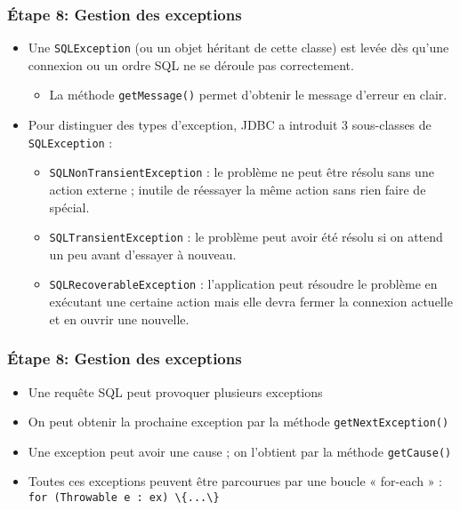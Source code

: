 \documentclass[xcolor=pdftex,x11names,table]{beamer}
\begin{document}
    \begin{frame}
    \frametitle{Étape 8: Gestion des exceptions}
    	\begin{itemize}
    		\item Une \lstinline$SQLException$ (ou un objet héritant de cette classe) est levée dès qu’une connexion 
    		ou un ordre SQL ne se déroule pas correctement.
    		  \begin{itemize}
    				\item La méthode \lstinline$getMessage()$ permet d'obtenir le message d'erreur en clair.
					\end{itemize}
				\item Pour distinguer des types d’exception, JDBC a introduit 3 sous-classes de \lstinline$SQLException$ :
				  \begin{itemize}
    				\item \lstinline$SQLNonTransientException$ : le problème ne peut être résolu sans une action externe ; 
    				inutile de réessayer la même action sans rien faire de spécial.
    				\item \lstinline$SQLTransientException$ : le problème peut avoir été résolu si on attend un peu avant 
    				d’essayer à nouveau.
    				\item \lstinline$SQLRecoverableException$ : l’application peut résoudre le problème en exécutant une 
    				certaine action mais elle devra fermer la connexion actuelle et en ouvrir une nouvelle.
					\end{itemize}
			\end{itemize}
		\end{frame}
		
		\begin{frame}
    \frametitle{Étape 8: Gestion des exceptions}
    	\begin{itemize}
    		\item Une requête SQL peut provoquer plusieurs exceptions
    		\item On peut obtenir la prochaine exception par la méthode \lstinline$getNextException()$
    		\item Une exception peut avoir une cause ; on l'obtient par la méthode \lstinline$getCause()$
    		\item Toutes ces exceptions peuvent être parcourues par une boucle « for-each » :\\
    		\lstinline$for (Throwable e : ex) \{...\}$ 
			\end{itemize}
		\end{frame}
		
\end{document}
